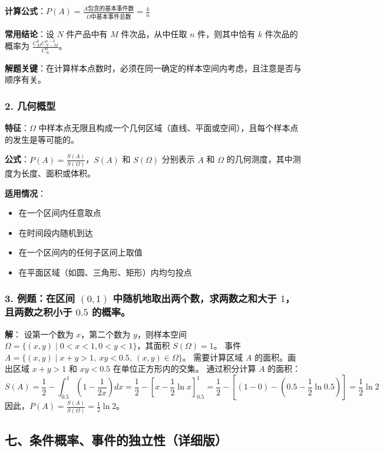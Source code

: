 \documentclass[12pt,a4paper]{ctexart}
\begin{document}
\textbf{计算公式}：$\displaystyle P(A) = \frac{A\text{包含的基本事件数}}{\Omega\text{中基本事件总数}} = \frac{k}{n}$

\textbf{常用结论}：设 $N$ 件产品中有 $M$ 件次品，从中任取 $n$ 件，则其中恰有 $k$ 件次品的概率为 $\displaystyle \frac{C_M^k C_{N-M}^{n-k}}{C_N^n}$。

\textbf{解题关键}：在计算样本点数时，必须在同一确定的样本空间内考虑，且注意是否与顺序有关。

\subsubsection{2. 几何概型}
\textbf{特征}：$\Omega$ 中样本点无限且构成一个几何区域（直线、平面或空间），且每个样本点的发生是等可能的。

\textbf{公式}：$\displaystyle P(A) = \frac{S(A)}{S(\Omega)}$，$S(A)$ 和 $S(\Omega)$ 分别表示 $A$ 和 $\Omega$ 的几何测度，其中测度为长度、面积或体积。

\textbf{适用情况}：
\begin{itemize}[noitemsep]
    \item 在一个区间内任意取点
    \item 在时间段内随机到达
    \item 在一个区间内的任何子区间上取值
    \item 在平面区域（如圆、三角形、矩形）内均匀投点
\end{itemize}

\subsubsection{3. 例题：在区间 $(0,1)$ 中随机地取出两个数，求两数之和大于 $1$，且两数之积小于 $0.5$ 的概率。}

\textbf{解}：
设第一个数为 $x$，第二个数为 $y$，则样本空间 $\Omega = \{(x,y) \mid 0 < x < 1, 0 < y < 1\}$，其面积 $S(\Omega) = 1$。
事件 $A = \{(x,y) \mid x+y > 1,\ xy < 0.5,\ (x,y) \in \Omega\}$。
需要计算区域 $A$ 的面积。画出区域 $x+y>1$ 和 $xy<0.5$ 在单位正方形内的交集。
通过积分计算 $A$ 的面积：
\[
    S(A) = \frac{1}{2} - \int_{0.5}^{1} \left(1 - \frac{1}{2x}\right) dx = \frac{1}{2} - \left[x - \frac{1}{2}\ln x\right]_{0.5}^{1} = \frac{1}{2} - \left[(1-0) - \left(0.5 - \frac{1}{2}\ln 0.5\right)\right] = \frac{1}{2} \ln 2
\]
因此，$\displaystyle P(A) = \frac{S(A)}{S(\Omega)} = \boxed{\frac{1}{2}\ln 2}$。

\subsection{七、条件概率、事件的独立性（详细版）}
\end{document}
